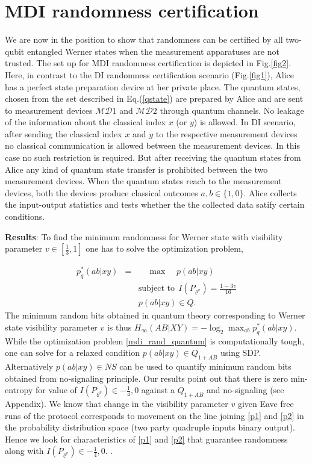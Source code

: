 \documentclass[doublecol,linenumbers]{epl2} %
\begin{document}
\section{MDI randomness certification}\label{sec4}
We are now in the position to show that randomness can be certified by all two-qubit entangled Werner states when the measurement apparatuses are not trusted. The set up for MDI randomness certification is depicted in Fig.\ref{fig2}. Here, in contrast to the DI randomness certification scenario (Fig.\ref{fig1}), Alice has a perfect state preparation device at her private place. The quantum states, chosen from the set described in Eq.(\ref{qstate}) are prepared by Alice and are sent to measurement devices $\mathcal{MD}1$ and $\mathcal{MD}2$ through quantum channels. No leakage of the information about the classical index $x$ (or $y$) is allowed. In DI scenario, after sending the classical index $x$ and $y$ to the respective measurement devices no classical communication is allowed between the measurement devices. In this case no such restriction is required. But after receiving the quantum states from Alice any kind of quantum state transfer is prohibited between the two measurement devices. When the quantum states reach to the measurement devices, both the devices produce classical outcomes $a,b\in \{1,0\}$. Alice collects the input-output statistics and tests whether the the collected data satify certain conditions.


{\bf Results}:
To find the minimum randomness for Werner state with visibility parameter $v\in[\frac{1}{3},1]$ one has to solve the optimization problem,

\begin{eqnarray}\label{mdi_rand_quantum}
p^*_q(ab|xy)&=&~~~~~~\mbox{max}~~~~~~p(ab|xy)\nonumber\\
&&\mbox{subject~to}~~I(P_{\varrho^v})=\frac{1-3v}{16}\nonumber\\
&& p(ab|xy)\in Q.
\end{eqnarray}
The minimum random bits obtained in quantum theory corresponding to Werner state visibility parameter $v$ is thus $H_\infty(AB|XY)=-\log_2\max_{ab}p_q^*(ab|xy)$. While the optimization problem \ref{mdi_rand_quantum} is computationally tough, one can solve for a relaxed condition $p(ab|xy)\in Q_{1+AB}$ using SDP. Alternatively $p(ab|xy)\in NS$ can be used to quantify minimum random bits obtained from no-signaling principle.
Our results point out that there is zero min-entropy for value of $I(P_{\varrho^v})\in {-\frac{1}{4},0}$ against a $Q_{1+AB}$ and no-signaling (see Appendix). 
We know that change in the visibility parameter $v$ given Eave free runs of the protocol corresponds to movement on the line joining \ref{p1} and \ref{p2} in the probability distribution space (two party quadruple inputs binary output). Hence we look for characteristics of \ref{p1} and \ref{p2} that guarantee randomness along with $I(P_{\varrho^v})\in {-\frac{1}{4},0}$. .
\end{document}
